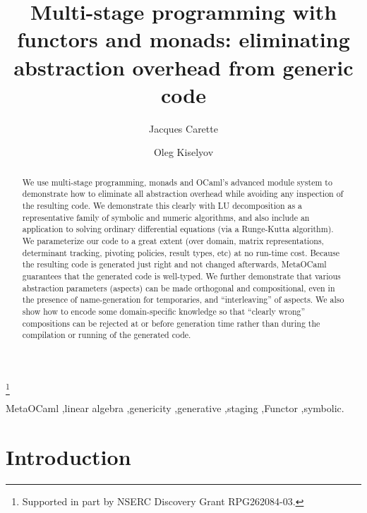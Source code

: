 \documentclass[draft]{elsart}
\begin{document}
\begin{frontmatter}
\title{Multi-stage programming with functors and monads:
eliminating abstraction overhead from generic code}
\author{Jacques Carette}
\address{McMaster University,
1280 Main St. West, Hamilton, Ontario Canada L8S 4K1}
\author{Oleg Kiselyov}
\address{FNMOC, Monterey, CA 93943}

\thanks[1]{Supported in part by NSERC Discovery Grant RPG262084-03.}

\begin{abstract}
We use multi-stage programming, monads and OCaml's
advanced module system to demonstrate how to eliminate all
abstraction overhead while avoiding any inspection of the resulting
code.  We demonstrate this clearly with LU decomposition as a 
representative family of symbolic and numeric algorithms, and also
include an application to solving ordinary differential equations 
(via a Runge-Kutta algorithm).
We parameterize our code to a great extent
(over domain, matrix representations, determinant tracking, 
pivoting policies, result types, etc) at no run-time cost.  Because
the resulting code is generated just right and not changed afterwards,
MetaOCaml guarantees that the generated code is well-typed.
We further demonstrate that various abstraction parameters (aspects)
can be made orthogonal and compositional, even in the presence of
name-generation for temporaries, and 
``interleaving'' of aspects.  We also show how to encode some
domain-specific knowledge so that ``clearly wrong'' compositions can
be rejected at or before generation time rather than during
the compilation or running of the generated code.
\end{abstract}

\begin{keyword}
MetaOCaml \sep linear algebra \sep genericity \sep generative \sep staging
\sep Functor \sep symbolic.
\end{keyword}
\end{frontmatter}

\section{Introduction}
\end{document}
